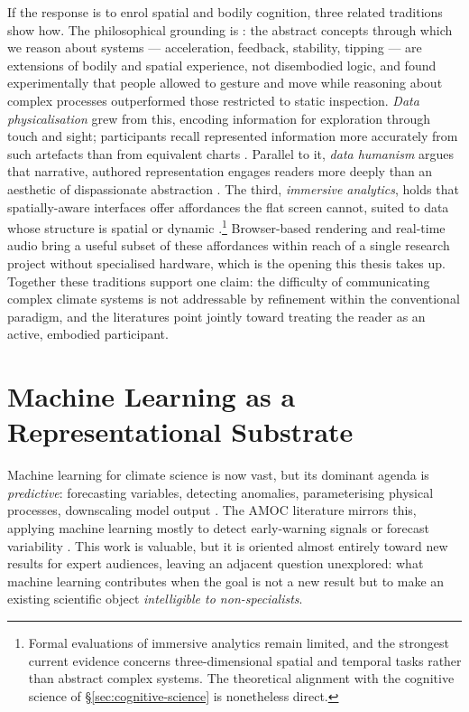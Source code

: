 If the response is to enrol spatial and bodily cognition, three related traditions show how. The philosophical grounding is \citet{lakoff1999}: the abstract concepts through which we reason about systems --- acceleration, feedback, stability, tipping --- are extensions of bodily and spatial experience, not disembodied logic, and \citet{kirsh2013} found experimentally that people allowed to gesture and move while reasoning about complex processes outperformed those restricted to static inspection. \emph{Data physicalisation} \citep{jansen2015} grew from this, encoding information for exploration through touch and sight; participants recall represented information more accurately from such artefacts than from equivalent charts \citep{moere2010}. Parallel to it, \emph{data humanism} argues that narrative, authored representation engages readers more deeply than an aesthetic of dispassionate abstraction \citep{lupi2017, segel2010}. The third, \emph{immersive analytics}, holds that spatially-aware interfaces offer affordances the flat screen cannot, suited to data whose structure is spatial or dynamic \citep{marriott2018}.\footnote{Formal evaluations of immersive analytics remain limited, and the strongest current evidence concerns three-dimensional spatial and temporal tasks rather than abstract complex systems. The theoretical alignment with the cognitive science of \S\ref{sec:cognitive-science} is nonetheless direct.} Browser-based rendering and real-time audio bring a useful subset of these affordances within reach of a single research project without specialised hardware, which is the opening this thesis takes up. Together these traditions support one claim: the difficulty of communicating complex climate systems is not addressable by refinement within the conventional paradigm, and the literatures point jointly toward treating the reader as an active, embodied participant.

\section{Machine Learning as a Representational Substrate}
\label{sec:ml-climate}

Machine learning for climate science is now vast, but its dominant agenda is \emph{predictive}: forecasting variables, detecting anomalies, parameterising physical processes, downscaling model output \citep{reichstein2019, sonnewald2021}. The AMOC literature mirrors this, applying machine learning mostly to detect early-warning signals or forecast variability \citep{boers2021, ditlevsen2023}. This work is valuable, but it is oriented almost entirely toward new results for expert audiences, leaving an adjacent question unexplored: what machine learning contributes when the goal is not a new result but to make an existing scientific object \emph{intelligible to non-specialists}.

